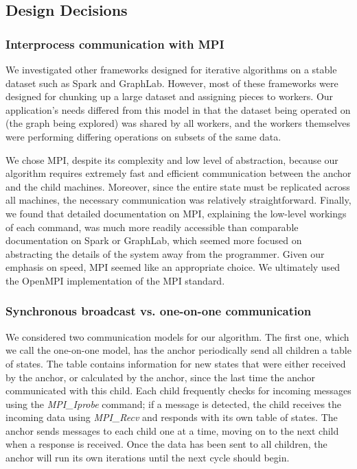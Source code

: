 \documentclass[11pt]{article}
\begin{document}
{\subsection{Design Decisions}

\subsubsection*{Interprocess communication with MPI}

We investigated other frameworks designed for iterative algorithms on a stable dataset such as Spark and GraphLab. However, most of these frameworks were designed for chunking up a large dataset and assigning pieces to workers. Our application's needs differed from this model in that the dataset being operated on (the graph being explored) was shared by all workers, and the workers themselves were performing differing operations on subsets of the same data.

We chose MPI, despite its complexity and low level of abstraction, because our algorithm requires extremely fast and efficient communication between the anchor and the child machines. Moreover, since the entire state must be replicated across all machines, the necessary communication was relatively straightforward. Finally, we found that detailed documentation on MPI, explaining the low-level workings of each command, was much more readily accessible than comparable documentation on Spark or GraphLab, which seemed more focused on abstracting the details of the system away from the programmer. Given our emphasis on speed, MPI seemed like an appropriate choice. We ultimately used the OpenMPI implementation of the MPI standard.

\subsubsection*{Synchronous broadcast vs. one-on-one communication}

We considered two communication models for our algorithm. The first one, which we call the one-on-one model, has the anchor periodically send all children a table of states. The table contains information for new states that were either received by the anchor, or calculated by the anchor, since the last time the anchor communicated with this child. Each child frequently checks for incoming messages using the \emph{MPI\_Iprobe} command; if a message is detected, the child receives the incoming data using \emph{MPI\_Recv} and responds with its own table of states. The anchor sends messages to each child one at a time, moving on to the next child when a response is received. Once the data has been sent to all children, the anchor will run its own iterations until the next cycle should begin.

}
\end{document}

